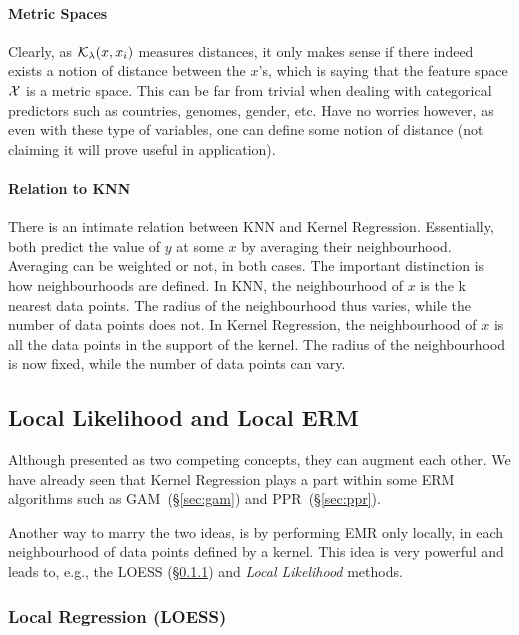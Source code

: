 \paragraph{Metric Spaces}
Clearly, as $\mathcal{K}_\lambda(x,x_i)$ measures distances, it only makes sense if there indeed exists a notion of distance between the $x$'s, which is saying that the feature space $\mathcal{X}$ is a metric space. 
This can be far from trivial when dealing with categorical predictors such as countries, genomes, gender, etc.
Have no worries however, as even with these type of variables, one can define some notion of distance (not claiming it will prove useful in application).


\paragraph{Relation to KNN}
There is an intimate relation between KNN and Kernel Regression. 
Essentially, both predict the value of $y$ at some $x$ by averaging their neighbourhood. 
Averaging can be weighted or not, in both cases.
The important distinction is how neighbourhoods are defined.
In KNN, the neighbourhood of $x$ is the k nearest data points. The radius of the neighbourhood thus varies, while the number of data points does not.
In Kernel Regression, the neighbourhood of $x$ is all the data points in the support of the kernel. The radius of the neighbourhood is now fixed, while the number of data points can vary.




\subsection{Local Likelihood and Local ERM}
Although presented as two competing concepts, they can augment each other. 
We have already seen that Kernel Regression plays a part within some ERM algorithms such as GAM~(\S\ref{sec:gam}) and PPR~(\S \ref{sec:ppr}).

Another way to marry the two ideas, is by performing EMR only locally, in each neighbourhood of data points defined by a kernel. This idea is very powerful and leads to, e.g., the LOESS (\S \ref{sec:loess}) and \emph{Local Likelihood} methods.



\subsubsection{Local Regression (LOESS)}
\label{sec:loess}

